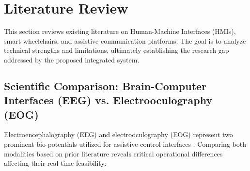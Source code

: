 \section{Literature Review}
\label{sec:literature_review}

This section reviews existing literature on Human-Machine Interfaces (HMIs), smart wheelchairs, and assistive communication platforms. The goal is to analyze technical strengths and limitations, ultimately establishing the research gap addressed by the proposed integrated system.

\subsection[Scientific Comparison: BCI (EEG) vs. EOG]{Scientific Comparison: Brain-Computer Interfaces (EEG) vs. Electrooculography (EOG)}
\label{subsec:eeg_vs_eog_comparison}

Electroencephalography (EEG) and electrooculography (EOG) represent two prominent bio-potentials utilized for assistive control interfaces \cite{onesensor2014proposals}. Comparing both modalities based on prior literature reveals critical operational differences affecting their real-time feasibility:

